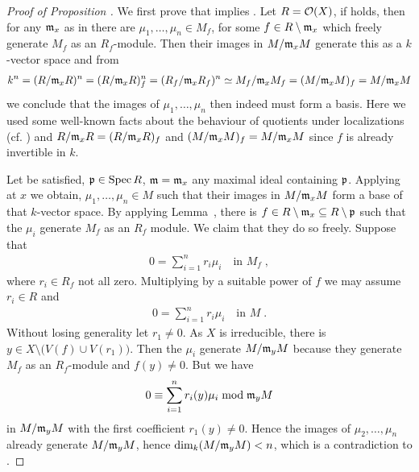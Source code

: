 \documentclass[a4paper,parskip=half,numbers=enddot, DIV=12]{scrreprt}
\begin{document}
\begin{proof}[Proof of Proposition ]
    We first prove that  implies . Let $R=\mathcal{O}(X)$, if  holds, then for any $\mathfrak{m}_x$ as in  there are $\mu_1,\ldots,\mu_n\in M_f$, for some $f\in R\setminus \mathfrak{m}_x$ which freely generate $M_f$ as an $R_f$-module. Then their images in $M/\mathfrak{m}_x M$ generate this as a $k$-vector space and from 
    \begin{align*}
    	k^n=(R/\mathfrak{m}_xR)^n=(R/\mathfrak{m}_xR)_f^n=(R_f/\mathfrak{m}_xR_f)^n\simeq M_f/\mathfrak{m}_xM_f=(M/\mathfrak{m}_xM)_f=M/\mathfrak{m}_xM
    \end{align*}
    we conclude that the images of $\mu_1,\ldots,\mu_n$ then indeed must form a basis. Here we used some well-known facts about the behaviour of quotients under localizations (cf. \cite[Proposition~2.3.2]{alg1}) and $R/\mathfrak{m}_xR=(R/\mathfrak{m}_xR)_f$ and $(M/\mathfrak{m}_xM)_f=M/\mathfrak{m}_xM$ since $f$ is already invertible in $k$.
    
    Let  be satisfied, $\mathfrak{p}\in \operatorname{Spec} R$, $\mathfrak{m} = \mathfrak{m}_x$ any maximal ideal containing $\mathfrak{p}$. Applying  at $x$ we obtain, $\mu_1,\ldots,\mu_n\in M$ such that their images in $M/\mathfrak{m}_x M$ form a base of that $k$-vector space. By applying Lemma~, there is $f\in R\setminus\mathfrak{m}_x\subseteq R\setminus \mathfrak{p}$ such that the $\mu_i$ generate $M_f$ as an $R_f$ module. We claim that they do so freely. Suppose that 
    \begin{align*}
    	0 = \sum_{i=1}^nr_i \mu_i\quad\text{in }M_f\;,
    \end{align*}
    where $r_i\in R_f$ not all zero. Multiplying by a suitable power of $f$ we may assume $r_i\in R$ and 
    \begin{align*}
    	 0=\sum_{i=1}^n r_i \mu_i \quad\text{in }M\;.
    \end{align*}
   Without losing generality let $r_1 \neq 0$. As $X$ is irreducible, there is $y\in X\setminus\big(V(f)\cup V(r_1)\big)$. Then the $\mu_i$ generate $M/\mathfrak{m}_y M$ because they generate $M_f$ as an $R_f$-module and $f(y)\neq 0$. But we have
    \begin{align*}
        0 \equiv\sum_{i=1}^n r_i(y) \mu_i \bmod \mathfrak{m}_y M
    \end{align*}
    in $M/\mathfrak{m}_y M$ with the first coefficient $r_1(y) \neq 0$. Hence the images of $\mu_2,\ldots,\mu_n$ already generate $M/\mathfrak{m}_y M$, hence $\dim_k(M/\mathfrak{m}_y M) <n$, which is a contradiction to .
\end{proof}
\end{document}
